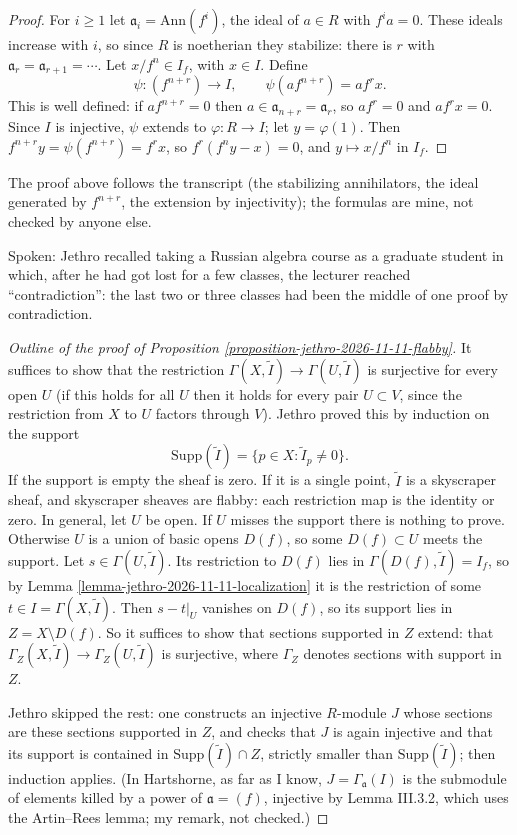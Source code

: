 \begin{proof}
For $i\geq 1$ let
$\mathfrak{a}_i=\mathrm{Ann}(f^i)$, the ideal
of $a\in R$ with $f^ia=0$. These ideals
increase with $i$, so since $R$ is
noetherian they stabilize: there is $r$ with
$\mathfrak{a}_r=\mathfrak{a}_{r+1}=\cdots$.
Let $x/f^n\in I_f$, with $x\in I$. Define
$$
\psi\colon (f^{n+r})\to I,\qquad
\psi(af^{n+r})=af^rx.
$$
This is well defined: if $af^{n+r}=0$ then
$a\in\mathfrak{a}_{n+r}=\mathfrak{a}_r$, so
$af^r=0$ and $af^rx=0$. Since $I$ is
injective, $\psi$ extends to
$\varphi\colon R\to I$; let $y=\varphi(1)$.
Then $f^{n+r}y=\psi(f^{n+r})=f^rx$, so
$f^r(f^ny-x)=0$, and $y\mapsto x/f^n$ in
$I_f$.
\end{proof}

\noindent
The proof above follows the transcript
(the stabilizing annihilators, the ideal
generated by $f^{n+r}$, the extension by
injectivity); the formulas are mine, not
checked by anyone else.

Spoken: Jethro recalled taking a Russian
algebra course as a graduate student in
which, after he had got lost for a few
classes, the lecturer reached
``contradiction'': the last two or three
classes had been the middle of one proof by
contradiction.

\begin{proof}[Outline of the proof of
Proposition
\ref{proposition-jethro-2026-11-11-flabby}]
It suffices to show that the restriction
$\Gamma(X,\widetilde{I})\to
\Gamma(U,\widetilde{I})$ is surjective for
every open $U$ (if this holds for all $U$
then it holds for every pair $U\subset V$,
since the restriction from $X$ to $U$
factors through $V$). Jethro proved this by
induction on the support
$$
\mathrm{Supp}(\widetilde{I})=\{p\in X :
\widetilde{I}_p\neq 0\}.
$$
If the support is empty the sheaf is zero.
If it is a single point, $\widetilde{I}$ is
a skyscraper sheaf, and skyscraper sheaves
are flabby: each restriction map is the
identity or zero. In general, let $U$ be
open. If $U$ misses the support there is
nothing to prove. Otherwise $U$ is a union
of basic opens $D(f)$, so some $D(f)\subset
U$ meets the support. Let
$s\in\Gamma(U,\widetilde{I})$. Its
restriction to $D(f)$ lies in
$\Gamma(D(f),\widetilde{I})=I_f$, so by
Lemma
\ref{lemma-jethro-2026-11-11-localization}
it is the restriction of some
$t\in I=\Gamma(X,\widetilde{I})$. Then
$s-t|_U$ vanishes on $D(f)$, so its support
lies in $Z=X\setminus D(f)$. So it suffices
to show that sections supported in $Z$
extend: that
$\Gamma_Z(X,\widetilde{I})\to
\Gamma_Z(U,\widetilde{I})$ is surjective,
where $\Gamma_Z$ denotes sections with
support in $Z$.

Jethro skipped the rest: one constructs an
injective $R$-module $J$ whose sections are
these sections supported in $Z$, and checks
that $J$ is again injective and that its
support is contained in
$\mathrm{Supp}(\widetilde{I})\cap Z$,
strictly smaller than
$\mathrm{Supp}(\widetilde{I})$; then
induction applies. (In Hartshorne, as far as
I know, $J=\Gamma_{\mathfrak{a}}(I)$ is the
submodule of elements killed by a power of
$\mathfrak{a}=(f)$, injective by Lemma
III.3.2,
which uses the Artin--Rees lemma; my remark,
not checked.)
\end{proof}

